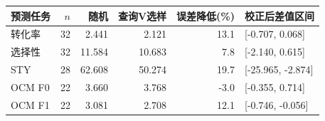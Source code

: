 \begin{tabular}{lrrrrl}\toprule 预测任务 & $n$ & 随机 & 查询V选样 & 误差降低(\%) & 校正后差值区间\\\midrule
转化率 & 32 & 2.441 & 2.121 & 13.1 & [-0.707, 0.068]\\
选择性 & 32 & 11.584 & 10.683 & 7.8 & [-2.140, 0.615]\\
STY & 28 & 62.608 & 50.274 & 19.7 & [-25.965, -2.874]\\
OCM F0 & 22 & 3.660 & 3.768 & -3.0 & [-0.355, 0.714]\\
OCM F1 & 22 & 3.081 & 2.708 & 12.1 & [-0.746, -0.056]\\
\bottomrule\end{tabular}
